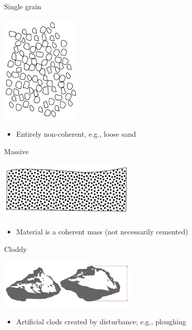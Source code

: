 \documentclass[
  letterpaper,
  DIV=11,
  numbers=noendperiod]{scrreprt}
\providecommand{\tightlist}{%
  \setlength{\itemsep}{0pt}\setlength{\parskip}{0pt}}\usepackage{longtable,booktabs,array}
\begin{document}
Single grain

\includegraphics{./table_8-41-12.png}

\begin{itemize}
\tightlist
\item
  Entirely non-coherent, e.g., loose sand
\end{itemize}

Massive

\includegraphics{./table_8-41-13.png}

\begin{itemize}
\tightlist
\item
  Material is a coherent mass (not necessarily cemented)
\end{itemize}

Cloddy

\includegraphics{./table_8-41-14.png}

\begin{itemize}
\tightlist
\item
  Artificial clods created by disturbance; e.g., ploughing
\end{itemize}
\end{document}
